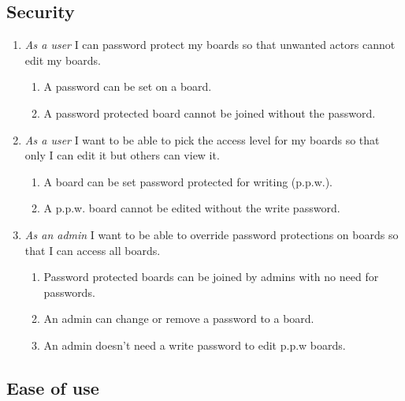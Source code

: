 \documentclass{article}
\begin{document}
	\subsection{Security}

	\begin{enumerate}
		\item \emph{As a user} I can password protect my boards so that unwanted actors cannot edit my boards.
			\begin{enumerate}
				\item A password can be set on a board.
				\item A password protected board cannot be joined without the password.
			\end{enumerate}
		\item \emph{As a user} I want to be able to pick the access level for my boards so that only I can edit it but others can view it.
			\begin{enumerate}
				\item A board can be set password protected for writing (p.p.w.).
				\item A p.p.w. board cannot be edited without the write password.
			\end{enumerate}
		\item \emph{As an admin} I want to be able to override password protections on boards so that I can access all boards.

			\begin{enumerate}
				\item Password protected boards can be joined by admins with no need for passwords.
				\item An admin can change or remove a password to a board.
				\item An admin doesn't need a write password to edit p.p.w boards. 
			\end{enumerate}
	\end{enumerate}

	\subsection{Ease of use}
\end{document}
